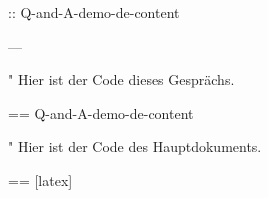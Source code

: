 \documentclass[%
  scroll,
]{Q-and-A}
\begin{document}
:: {Q-and-A-demo-de-content}


---

"
  Hier ist der Code dieses Gesprächs.

  == {Q-and-A-demo-de-content}

"
  Hier ist der Code des Hauptdokuments.

  == [latex] {\jobname}
\end{document}
